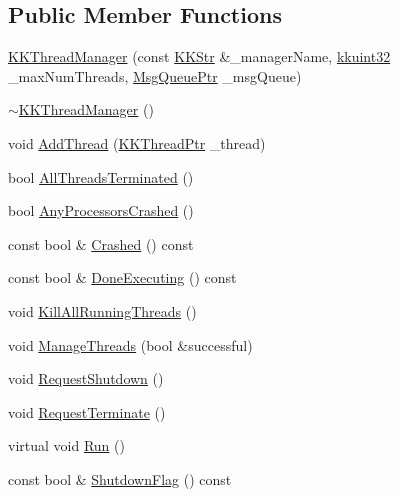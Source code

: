 \subsection*{Public Member Functions}
\begin{DoxyCompactItemize}
\item 
\hyperlink{class_k_k_b_1_1_k_k_thread_manager_afdfc7670c3ad323fa799f1a9d20da049}{K\+K\+Thread\+Manager} (const \hyperlink{class_k_k_b_1_1_k_k_str}{K\+K\+Str} \&\+\_\+manager\+Name, \hyperlink{namespace_k_k_b_af8d832f05c54994a1cce25bd5743e19a}{kkuint32} \+\_\+max\+Num\+Threads, \hyperlink{namespace_k_k_b_aaa43074273f12ed325a053d9e1faf84a}{Msg\+Queue\+Ptr} \+\_\+msg\+Queue)
\item 
\hyperlink{class_k_k_b_1_1_k_k_thread_manager_a691c1829d4259916c1cdb712adaebda6}{$\sim$\+K\+K\+Thread\+Manager} ()
\item 
void \hyperlink{class_k_k_b_1_1_k_k_thread_manager_ae1534656719cde8f4e831bc5dbdcc807}{Add\+Thread} (\hyperlink{class_k_k_b_1_1_k_k_thread_ae0ca65f275a57c346e71486ad84b271a}{K\+K\+Thread\+Ptr} \+\_\+thread)
\item 
bool \hyperlink{class_k_k_b_1_1_k_k_thread_manager_a2397d90b12c0d6ae9c46327536462977}{All\+Threads\+Terminated} ()
\item 
bool \hyperlink{class_k_k_b_1_1_k_k_thread_manager_a4c9dfc61200e85a537169059a6c4dd28}{Any\+Processors\+Crashed} ()
\item 
const bool \& \hyperlink{class_k_k_b_1_1_k_k_thread_manager_a2af16702df76d09363ef3e1571327c1e}{Crashed} () const 
\item 
const bool \& \hyperlink{class_k_k_b_1_1_k_k_thread_manager_a16d2106088911878f5aed5b588b0f8fe}{Done\+Executing} () const 
\item 
void \hyperlink{class_k_k_b_1_1_k_k_thread_manager_a21bbabcebe4b2bb75eedacf1687c2a1b}{Kill\+All\+Running\+Threads} ()
\item 
void \hyperlink{class_k_k_b_1_1_k_k_thread_manager_a3fd0f1b9b3545e8a854c87bdb9d8925f}{Manage\+Threads} (bool \&successful)
\item 
void \hyperlink{class_k_k_b_1_1_k_k_thread_manager_a6698417860dc2d7a388410e6179b745d}{Request\+Shutdown} ()
\item 
void \hyperlink{class_k_k_b_1_1_k_k_thread_manager_accc182d863cbdb191c3e6c882e89a5b6}{Request\+Terminate} ()
\item 
virtual void \hyperlink{class_k_k_b_1_1_k_k_thread_manager_ad1dfab64405504de3a8d8506d18b6ddd}{Run} ()
\item 
const bool \& \hyperlink{class_k_k_b_1_1_k_k_thread_manager_a2b25dda44e5c861e920e5f8f81a398fd}{Shutdown\+Flag} () const 

\end{DoxyCompactItemize}
